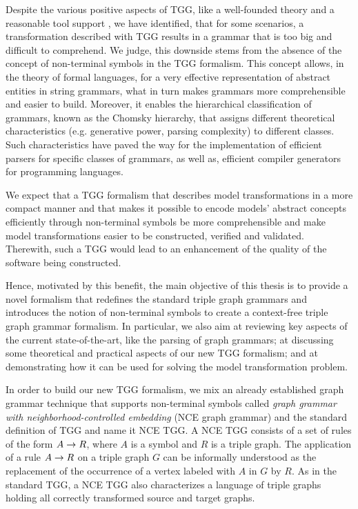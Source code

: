 Despite the various positive aspects of TGG, like a well-founded theory and a reasonable tool support \cite{anjorin201620}, we have identified, that for some scenarios, a transformation described with TGG results in a grammar that is too big and difficult to comprehend. We judge, this downside stems from the absence of the concept of non-terminal symbols in the TGG formalism. This concept allows, in the theory of formal languages, for a very effective representation of abstract entities in string grammars, what in turn makes grammars more comprehensible and easier to build. Moreover, it enables the hierarchical classification of grammars, known as the Chomsky hierarchy, that assigns different theoretical characteristics (e.g. generative power, parsing complexity) to different classes. Such characteristics have paved the way for the implementation of efficient parsers for specific classes of grammars, as well as, efficient compiler generators for programming languages.

We expect that a TGG formalism that describes model transformations in a more compact manner and that makes it possible to encode models' abstract concepts efficiently through non-terminal symbols be more comprehensible and make model transformations easier to be constructed, verified and validated. Therewith, such a TGG would lead to an enhancement of the quality of the software being constructed.

Hence, motivated by this benefit, the main objective of this thesis is to provide a novel formalism that redefines the standard triple graph grammars and introduces the notion of non-terminal symbols to create a context-free triple graph grammar formalism. In particular, we also aim at reviewing key aspects of the current state-of-the-art, like the parsing of graph grammars; at discussing some theoretical and practical aspects of our new TGG formalism; and at demonstrating how it can be used for solving the model transformation problem.

In order to build our new TGG formalism, we mix an already established graph grammar technique that supports non-terminal symbols called \emph{graph grammar with neighborhood-controlled embedding} (NCE graph grammar) \cite{janssens1982graph} and the standard definition of TGG \cite{schurr1994specification} and name it NCE TGG. A NCE TGG consists of a set of rules of the form $A \to R$, where $A$ is a symbol and $R$ is a triple graph. The application of a rule $A \to R$ on a triple graph $G$ can be informally understood as the replacement of the occurrence of a vertex labeled with $A$ in $G$ by $R$. As in the standard TGG, a NCE TGG also characterizes a language of triple graphs holding all correctly transformed source and target graphs.

